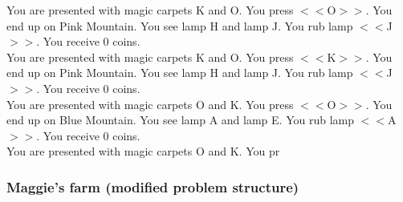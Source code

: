 \documentclass[pdflatex,sn-nature]{sn-jnl}%
\theoremstyle{thmstyleone}%
\theoremstyle{thmstyletwo}%
\theoremstyle{thmstylethree}%
\begin{document}
You are presented with magic carpets K and O. You press $<<$O$>>$. You end up on Pink Mountain. You see lamp H and lamp J. You rub lamp $<<$J$>>$. You receive 0 coins. $~$\\ 
You are presented with magic carpets K and O. You press $<<$K$>>$. You end up on Pink Mountain. You see lamp H and lamp J. You rub lamp $<<$J$>>$. You receive 0 coins. $~$\\ 
You are presented with magic carpets O and K. You press $<<$O$>>$. You end up on Blue Mountain. You see lamp A and lamp E. You rub lamp $<<$A$>>$. You receive 0 coins. $~$\\ 
You are presented with magic carpets O and K. You pr

\subsubsection*{Maggie's farm (modified problem structure)}
\end{document}
